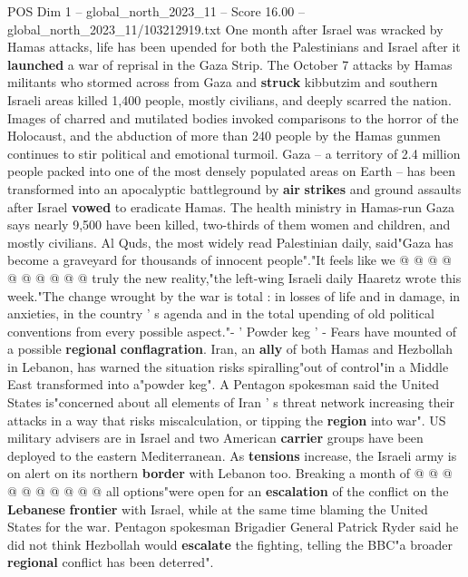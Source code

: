 \begin{textsample}{POS Dim 1 – global\_north\_2023\_11 – Score 16.00 – global\_north\_2023\_11/103212919.txt}  \label{ex:f1_pos_355}
One month after Israel was wracked by Hamas attacks, life has been upended for both the Palestinians and Israel after it \textbf{launched} a war of reprisal in the Gaza Strip.
The October 7 attacks by Hamas militants who stormed across from Gaza and \textbf{struck} kibbutzim and southern Israeli areas killed 1,400 people, mostly civilians, and deeply scarred the nation.
Images of charred and mutilated bodies invoked comparisons to the horror of the Holocaust, and the abduction of more than 240 people by the Hamas gunmen continues to stir political and emotional turmoil.
Gaza -- a territory of 2.4 million people packed into one of the most densely populated areas on Earth -- has been transformed into an apocalyptic battleground by \textbf{air} \textbf{strikes} and ground assaults after Israel \textbf{vowed} to eradicate Hamas.
The health ministry in Hamas-run Gaza says nearly 9,500 have been killed, two-thirds of them women and children, and mostly civilians.
Al Quds, the most widely read Palestinian daily, said"Gaza has become a graveyard for thousands of innocent people"."It feels like we @ @ @ @ @ @ @ @ @ @ truly the new reality,"the left-wing Israeli daily Haaretz wrote this week."The change wrought by the war is total : in losses of life and in damage, in anxieties, in the country ' s agenda and in the total upending of old political conventions from every possible aspect."- ' Powder keg ' - Fears have mounted of a possible \textbf{regional} \textbf{conflagration}.
Iran, an \textbf{ally} of both Hamas and Hezbollah in Lebanon, has warned the situation risks spiralling"out of control"in a Middle East transformed into a"powder keg".
A Pentagon spokesman said the United States is"concerned about all elements of Iran ' s threat network increasing their attacks in a way that risks miscalculation, or tipping the \textbf{region} into war".
US military advisers are in Israel and two American \textbf{carrier} groups have been deployed to the eastern Mediterranean.
As \textbf{tensions} increase, the Israeli army is on alert on its northern \textbf{border} with Lebanon too.
Breaking a month of @ @ @ @ @ @ @ @ @ @ all options"were open for an \textbf{escalation} of the conflict on the \textbf{Lebanese} \textbf{frontier} with Israel, while at the same time blaming the United States for the war.
Pentagon spokesman Brigadier General Patrick Ryder said he did not think Hezbollah would \textbf{escalate} the fighting, telling the BBC"a broader \textbf{regional} conflict has been deterred".

\end{textsample}
